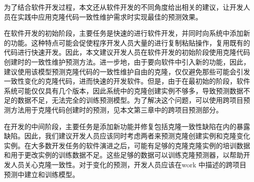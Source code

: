 为了结合软件开发过程，本文还从软件开发的不同角度给出相关的建议，让开发人员在实践中应用克隆代码一致性维护需求时实现最佳的预测效果。

在软件开发的初始阶段，主要任务是快速的进行软件开发，并同时向系统中添加新的功能。这种特点可能会促使程序开发人员大量的进行复制粘贴操作，复用既有的代码进行快速开发。因此，本文建议开发人员在软件开发的初始阶段使用克隆代码创建时的一致性维护预测方法。进一步地，由于要向软件中引入新的功能，因此，建议使用该模型预测克隆代码的一致性维护自由的克隆，仅仅避免那些可能会引发一致性变化的克隆代码，进而快速的开发软件。但是，由于在最初始的阶段，软件系统可能仅仅具有几个版本，因此系统中的克隆创建实例不够多，导致预测数据不足的数据不足，无法完全的训练预测模型。为了解决这个问题，可以使用跨项目预测方法用于克隆代码创建时的预测，见本文第三章中的跨项目预测部分。


在开发的中间阶段，主要任务是添加新功能并修复包括克隆一致性缺陷在内的暴露缺陷。因此，我们建议开发人员应该同时考虑两者来预测克隆创建实例和克隆变化实例。在大多数开发任务的软件演进之后，可能有足够的克隆克隆实例的培训数据和用于更改实例的训练数据不足。这些足够的数据可以训练克隆预测器，以帮助开发人员关心克隆一致性。对于变化的预测，开发人员应该在work \cite{zhang2016predicting}中描述的跨项目预测中建立和训练模型。


